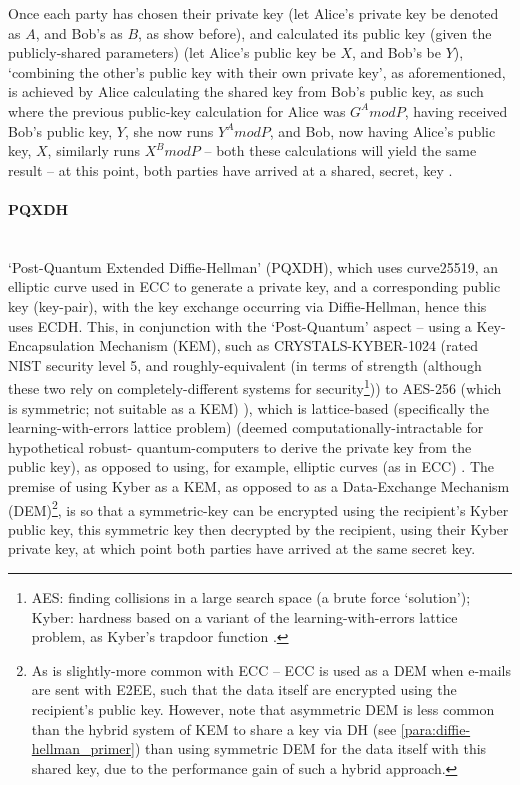 Once each party has chosen their private key (let Alice's private key be denoted as $A$, and Bob's as $B$, as show before), and calculated its public key (given the publicly-shared parameters) (let Alice's public key be $X$, and Bob's be $Y$), `combining the other's public key with their own private key', as aforementioned, is achieved by Alice calculating the shared key from Bob's public key, as such where the previous public-key calculation for Alice was $G^A mod P$, having received Bob's public key, $Y$, she now runs $Y^A mod P$, and Bob, now having Alice's public key, $X$, similarly runs $X^B mod P$ -- both these calculations will yield the same result -- at this point, both parties have arrived at a shared, secret, key \citep{geeks:dh}.
\paragraph{PQXDH}
\label{para:pqxdh}
\noindent\\
`Post-Quantum Extended Diffie-Hellman' (PQXDH), which uses curve25519, an elliptic curve used in ECC to generate a private key, and a corresponding public key (key-pair), with the key exchange occurring via Diffie-Hellman, hence this uses ECDH. This, in conjunction with the `Post-Quantum' aspect -- using a Key-Encapsulation Mechanism (KEM), such as CRYSTALS-KYBER-1024 (rated NIST security level 5, and roughly-equivalent (in terms of strength (although these two rely on completely-different systems for security\footnote{AES: finding collisions in a large search space (a brute force `solution'); Kyber: hardness based on a variant of the learning-with-errors lattice problem, as Kyber's trapdoor function \citep{wikipedia:kyber}.})) to AES-256 (which is symmetric; not suitable as a KEM) \citep{wikipedia:kyber}), which is lattice-based (specifically the learning-with-errors lattice problem) (deemed computationally-intractable for hypothetical robust- quantum-computers to derive the private key from the public key), as opposed to using, for example, elliptic curves (as in ECC) \citep{signal:pqxdh}. The premise of using Kyber as a KEM, as opposed to as a Data-Exchange Mechanism (DEM)\footnote{As is slightly-more common with ECC -- ECC is used as a DEM when e-mails are sent with E2EE, such that the data itself are encrypted using the recipient's public key. However, note that asymmetric DEM is less common than the hybrid system of KEM to share a key via DH (see \cref{para:diffie-hellman_primer}) than using symmetric DEM for the data itself with this shared key, due to the performance gain of such a hybrid approach.}, is so that a symmetric-key can be encrypted using the recipient's Kyber public key, this symmetric key then decrypted by the recipient, using their Kyber private key, at which point both parties have arrived at the same secret key.\\
